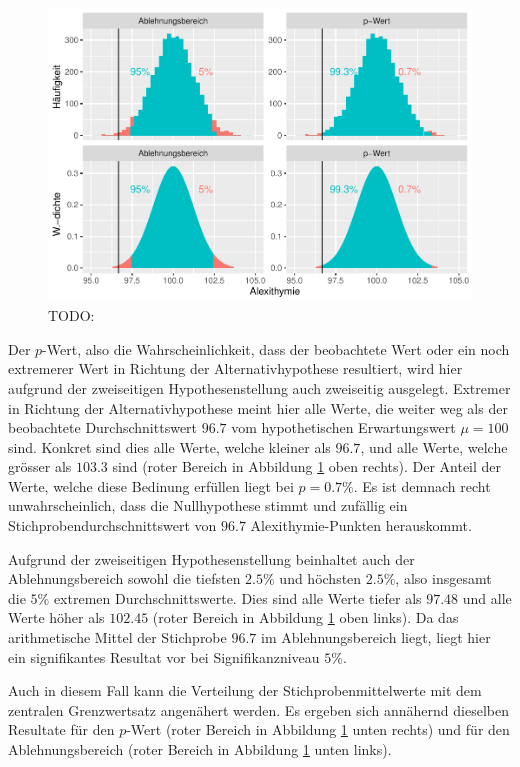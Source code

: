 \documentclass[
]{book}
\theoremstyle{definition}
\theoremstyle{definition}
\theoremstyle{definition}
\theoremstyle{definition}
\theoremstyle{remark}
\begin{document}
\begin{figure}
\centering
\includegraphics{aps_statistik1_files/figure-latex/exm-alexithymie-plot-1.pdf}
\caption{\label{fig:exm-alexithymie-plot}TODO:}
\end{figure}

Der \(p\)-Wert, also die Wahrscheinlichkeit, dass der beobachtete Wert oder ein noch extremerer Wert in Richtung der Alternativhypothese resultiert, wird hier aufgrund der zweiseitigen Hypothesenstellung auch zweiseitig ausgelegt. Extremer in Richtung der Alternativhypothese meint hier alle Werte, die weiter weg als der beobachtete Durchschnittswert \(96.7\) vom hypothetischen Erwartungswert \(\mu = 100\) sind. Konkret sind dies alle Werte, welche kleiner als \(96.7\), und alle Werte, welche grösser als \(103.3\) sind (roter Bereich in Abbildung \ref{fig:exm-alexithymie-plot} oben rechts). Der Anteil der Werte, welche diese Bedinung erfüllen liegt bei \(p = 0.7\%\). Es ist demnach recht unwahrscheinlich, dass die Nullhypothese stimmt und zufällig ein Stichprobendurchschnittswert von \(96.7\) Alexithymie-Punkten herauskommt.

Aufgrund der zweiseitigen Hypothesenstellung beinhaltet auch der Ablehnungsbereich sowohl die tiefsten \(2.5\%\) und höchsten \(2.5\%\), also insgesamt die \(5\%\) extremen Durchschnittswerte. Dies sind alle Werte tiefer als \(97.48\) und alle Werte höher als \(102.45\) (roter Bereich in Abbildung \ref{fig:exm-alexithymie-plot} oben links). Da das arithmetische Mittel der Stichprobe \(96.7\) im Ablehnungsbereich liegt, liegt hier ein signifikantes Resultat vor bei Signifikanzniveau \(5\%\).

Auch in diesem Fall kann die Verteilung der Stichprobenmittelwerte mit dem zentralen Grenzwertsatz angenähert werden. Es ergeben sich annähernd dieselben Resultate für den \(p\)-Wert (roter Bereich in Abbildung \ref{fig:exm-alexithymie-plot} unten rechts) und für den Ablehnungsbereich (roter Bereich in Abbildung \ref{fig:exm-alexithymie-plot} unten links).
\end{document}
